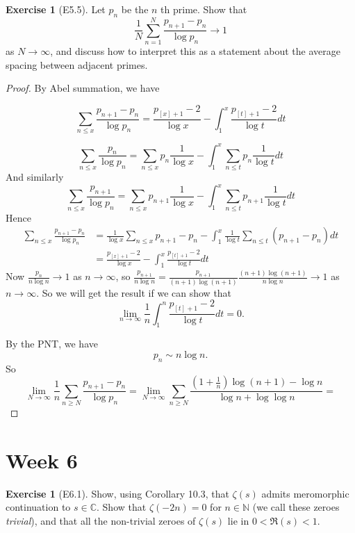 \documentclass[reqno]{amsart}
\theoremstyle{definition}
\newtheorem{exercise}[theorem]{Exercise}
\theoremstyle{remark}
\begin{document}
\begin{exercise}[E5.5]
    Let $p_n$ be the $n$ th prime. Show that
    \[
    \frac{1}{N} \sum_{n=1}^{N} \frac{p_{n+1}- p_n}{\log p_n}
    \to 1
    \] 
    as $N \to \infty$, and discuss how to interpret
    this as a statement about the average
    spacing between adjacent primes.
\end{exercise}


\begin{proof}
    By Abel summation, we have

    \[
    \sum_{n\le x}
    \frac{p_{n+1}- p_n}{\log p_n}
    = 
    \frac{p_{\left[ x \right] +1}-2}{\log x}
    - \int_{1}^{x} \frac{p_{\left[ t \right] +1}-2}{\log t}dt 
    \] 


    \[
    \sum_{n\le x} \frac{p_n}{\log p_n}
    = \sum_{n\le x} p_n \frac{1}{\log x}
    - \int_{1}^{x} \sum_{n\le t} p_n \frac{1}{\log t}dt 
    \] 
    And similarly
    \[
    \sum_{n\le x} \frac{p_{n+1}}{\log p_n}
    = \sum_{n\le x} p_{n+1} \frac{1}{\log x}
    - \int_{1}^{x} \sum_{n\le t} p_{n+1} \frac{1}{\log t}dt 
    \] 
    Hence
    \begin{align*}
    \sum_{n\le x} \frac{p_{n+1} - p_n}{\log p_n}
    &= \frac{1}{\log x} \sum_{n\le x} p_{n+1} -p_n
    - \int_{1}^{x} \frac{1}{\log t} \sum_{n \le t}(p_{n+1}-p_n) dt\\
    &= \frac{p_{\left[ x \right] +1} - 2}{\log x} 
    - \int_{1}^{x} \frac{p_{\left[ t \right] +1} - 2}{\log t} dt
    \end{align*}
    Now
    $\frac{p_n}{n \log n} \to 1$ as $n \to \infty$, so
    $\frac{p_{n+1}}{n \log n}
    = \frac{p_{n+1}}{(n+1) \log(n+1)} \frac{(n+1) \log(n+1)}{
    n \log n}
    \to 1$ as $n \to \infty$. So we will get
    the result if we can show that
    \[
    \lim_{n \to \infty} \frac{1}{n} 
    \int_{1}^{n} \frac{p_{\left[ t \right] +1}-2}{\log t} dt 
    = 0.
    \] 

    By the PNT, we have
    \[
    p_n \sim n \log n.
    \] 
    So
    \[
    \lim_{N \to \infty} \frac{1}{n} \sum_{n \ge N}
    \frac{p_{n+1}-p_n}{\log p_n}
    = \lim_{N\to \infty}
    \sum_{n\ge N} \frac{(1+\frac{1}{n})\log(n+1) - \log n}{\log n + 
    \log \log n}
    = 
    \] 
\end{proof}


\section{Week 6}

\begin{exercise}[E6.1]
    Show, using Corollary 10.3, that
    $\zeta(s)$ admits meromorphic continuation
    to $s \in \mathbb{C}$. Show that
    $\zeta\left( -2n \right) =0$ for
    $n \in \mathbb{N} $ (we call these
    zeroes \textit{trivial}), and that
    all the non-trivial zeroes of
    $\zeta(s)$ lie in
    $0 < \Re(s) < 1$.
\end{exercise}
\end{document}
